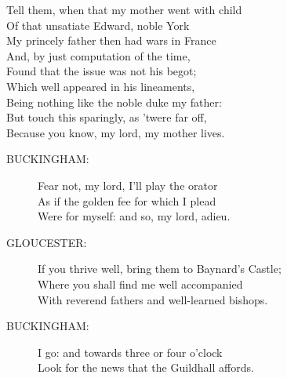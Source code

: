 \documentclass{article}
\begin{document}
\begin{description}
\hspace{1pt}Tell them, when that my mother went with child\\
\hspace{1pt}Of that unsatiate Edward, noble York\\
\hspace{1pt}My princely father then had wars in France\\
\hspace{1pt}And, by just computation of the time,\\
\hspace{1pt}Found that the issue was not his begot;\\
\hspace{1pt}Which well appeared in his lineaments,\\
\hspace{1pt}Being nothing like the noble duke my father:\\
\hspace{1pt}But touch this sparingly, as 'twere far off,\\
\hspace{1pt}Because you know, my lord, my mother lives.\\
\end{description}
\begin{description}
\item[BUCKINGHAM:] 
\hspace{1pt}Fear not, my lord, I'll play the orator\\
\hspace{1pt}As if the golden fee for which I plead\\
\hspace{1pt}Were for myself: and so, my lord, adieu.\\
\end{description}
\begin{description}
\item[GLOUCESTER:] 
\hspace{1pt}If you thrive well, bring them to Baynard's Castle;\\
\hspace{1pt}Where you shall find me well accompanied\\
\hspace{1pt}With reverend fathers and well-learned bishops.\\
\end{description}
\begin{description}
\item[BUCKINGHAM:] 
\hspace{1pt}I go: and towards three or four o'clock\\
\hspace{1pt}Look for the news that the Guildhall affords.\\
\end{description}
\end{document}
